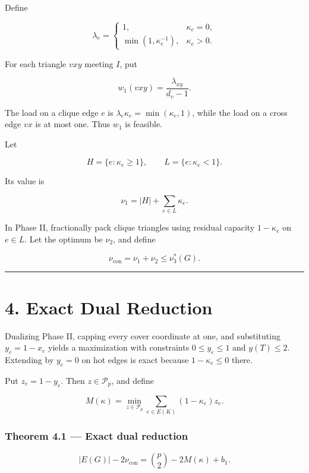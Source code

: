 \documentclass[11pt,a4paper]{article}
\begin{document}
Define

\[
\lambda_e=
\begin{cases}
1,&\kappa_e=0,\\
\min(1,\kappa_e^{-1}),&\kappa_e>0.
\end{cases}
\]

For each triangle \(vxy\) meeting \(I\), put

\[
w_1(vxy)=\frac{\lambda_{xy}}{d_v-1}.
\tag{3.3}
\]

The load on a clique edge \(e\) is \(\lambda_e\kappa_e=\min(\kappa_e,1)\), while the load on a cross edge \(vx\) is at most one. Thus \(w_1\) is feasible.

Let

\[
H=\{e:\kappa_e\ge1\},
\qquad
L=\{e:\kappa_e<1\}.
\]

Its value is

\[
\nu_1=|H|+\sum_{e\in L}\kappa_e.
\tag{3.4}
\]

In Phase II, fractionally pack clique triangles using residual capacity \(1-\kappa_e\) on \(e\in L\). Let the optimum be \(\nu_2\), and define

\[
\nu_{\mathrm{con}}=\nu_1+\nu_2\le\nu_3^*(G).
\tag{3.5}
\]

\begin{center}\rule{0.5\linewidth}{0.5pt}\end{center}

\section{4. Exact Dual Reduction}\label{exact-dual-reduction}

Dualizing Phase II, capping every cover coordinate at one, and substituting \(y_e=1-x_e\) yields a maximization with constraints \(0\le y_e\le1\) and \(y(T)\le2\). Extending by \(y_e=0\) on hot edges is exact because \(1-\kappa_e\le0\) there.

Put \(z_e=1-y_e\). Then \(z\in\mathcal P_p\), and define

\[
M(\kappa)
=
\min_{z\in\mathcal P_p}
\sum_{e\in E(K)}(1-\kappa_e)z_e.
\tag{4.1}
\]

\subsubsection{Theorem 4.1 --- Exact dual reduction}\label{theorem-4.1-exact-dual-reduction}

\[
\boxed{
|E(G)|-2\nu_{\mathrm{con}}
=
\binom p2-2M(\kappa)+b_1.
}
\tag{4.2}
\]
\end{document}
